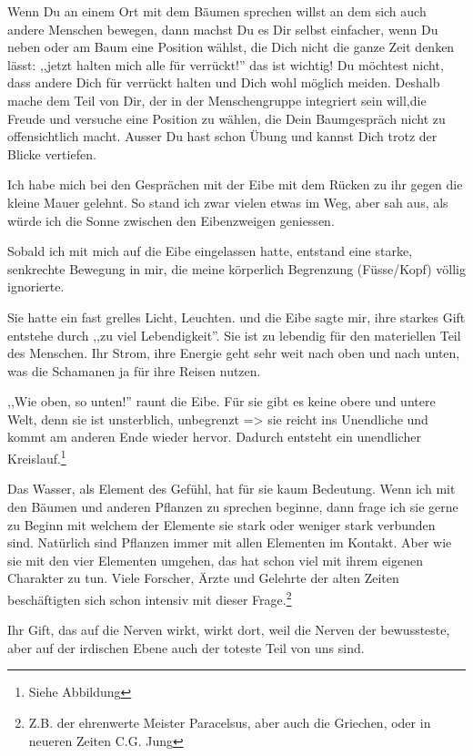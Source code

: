 \documentclass[11pt,titlepage,a5paper]{book}
\begin{document}
Wenn Du an einem Ort mit dem Bäumen sprechen willst an dem sich auch andere Menschen bewegen, dann machst Du es Dir selbst einfacher, wenn Du neben oder am Baum eine Position wählst, die Dich nicht die ganze Zeit denken lässt: ,,jetzt halten mich alle für verrückt!'' das ist wichtig! Du möchtest nicht, dass andere Dich für verrückt halten und Dich wohl möglich  meiden. Deshalb mache dem Teil von Dir, der in der Menschengruppe integriert sein will,die Freude und versuche eine Position zu wählen, die Dein Baumgespräch nicht zu offensichtlich macht. Ausser Du hast schon Übung und kannst Dich trotz der Blicke vertiefen.

Ich habe mich bei den Gesprächen mit der Eibe mit dem Rücken zu ihr gegen die kleine Mauer gelehnt. So stand ich zwar vielen etwas im Weg, aber sah aus, als würde ich die Sonne zwischen den Eibenzweigen geniessen.

Sobald ich mit mich auf die Eibe eingelassen hatte, entstand eine starke, senkrechte Bewegung in mir, die meine körperlich Begrenzung (Füsse/Kopf) völlig ignorierte.

Sie hatte ein fast grelles Licht, Leuchten. und die Eibe sagte mir, ihre starkes Gift entstehe durch ,,zu viel Lebendigkeit''. Sie ist zu lebendig für den materiellen Teil des Menschen. Ihr Strom, ihre Energie geht sehr weit nach oben und nach unten, was die Schamanen ja für ihre Reisen nutzen.

,,Wie oben, so unten!'' raunt die Eibe. Für sie gibt es keine obere und untere Welt, denn sie ist unsterblich, unbegrenzt => sie reicht ins Unendliche und kommt am anderen Ende wieder hervor. Dadurch entsteht ein unendlicher Kreislauf.\footnote{Siehe Abbildung}

Das Wasser, als Element des Gefühl, hat für sie kaum Bedeutung. Wenn ich mit den Bäumen und anderen Pflanzen zu sprechen beginne, dann frage ich sie gerne zu Beginn mit welchem der Elemente sie stark oder weniger stark verbunden sind. Natürlich sind Pflanzen immer mit allen Elementen im Kontakt. Aber wie sie mit den vier Elementen umgehen, das hat schon viel mit ihrem eigenen Charakter zu tun. Viele Forscher, Ärzte und Gelehrte der alten Zeiten beschäftigten sich schon intensiv mit dieser Frage.\footnote{Z.B. der ehrenwerte Meister Paracelsus, aber auch die Griechen, oder in neueren Zeiten C.G. Jung}

 Ihr Gift, das auf die Nerven wirkt, wirkt dort, weil die Nerven der bewussteste, aber auf der irdischen Ebene auch der toteste Teil von uns sind.
\end{document}
